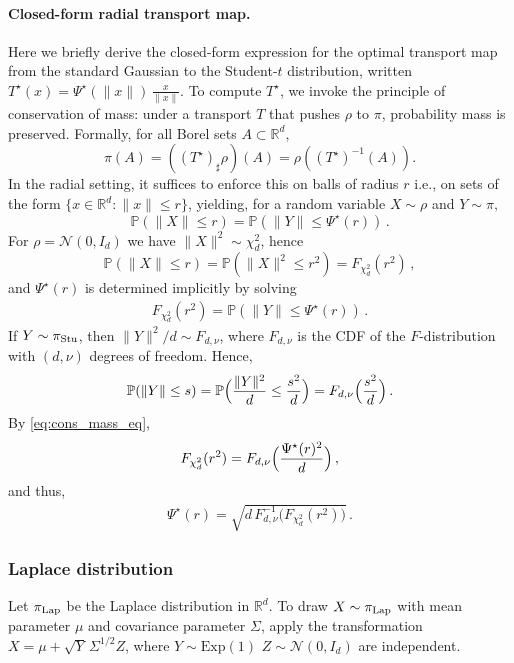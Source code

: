 \documentclass[twoside]{article}
\newcommand{\1}{\mathds{1}}
\newcommand{\R}{\mathbb{R}}
\theoremstyle{plain}
\theoremstyle{definition}
\theoremstyle{remark}
\begin{document}
\paragraph{Closed-form radial transport map.}
Here we briefly derive the closed-form expression for the optimal transport map from the standard Gaussian to the Student-$t$ distribution, written $T^\star(x) = \Psi^\star(\|x\|)\,\frac{x}{\|x\|}$. 
To compute $T^\star$, we invoke the principle of conservation of mass: under a transport $T$ that pushes $\rho$ to $\pi$, probability mass is preserved. Formally, for all Borel sets $A\subset\mathbb{R}^d$,
\[
\pi(A) = ((T^\star)_\sharp \rho)(A) = \rho\!\left((T^\star)^{-1}(A)\right).
\]
In the radial setting, it suffices to enforce this on balls of radius $r$ i.e., on sets of the form $\{x\in\R^d :\|x\|\le r\}$, yielding, for a random variable $X\sim\rho$ and $Y\sim\pi,$
\[
\mathbb{P}(\|X\|\le r)=\mathbb{P}(\|Y\|\le \Psi^\star(r))\,.
\]
For $\rho=\mathcal{N}(0,I_d)$ we have $\|X\|^2\sim\chi_d^2$, hence
\[
\mathbb{P}(\|X\|\le r)=\mathbb{P}(\|X\|^2\le r^2)=F_{\chi^2_d}(r^2)\, ,
\]
and ${\Psi^\star(r)}$ is determined implicitly by solving
\begin{align}\label{eq:cons_mass_eq}
    F_{\chi^2_d}(r^2)=\mathbb{P}(\|Y\|\le \Psi^\star(r))\,.
\end{align}
If $Y\sim\pi_{\rm Stu}$, then $\|Y\|^2/d\sim F_{d,\nu}$, where $F_{d,\nu}$ is the CDF of the $F$-distribution with $(d,\nu)$ degrees of freedom. Hence,
\begin{align*}
\mathbb{P}(\|Y\|\le s)=\mathbb{P}\Bigl(\frac{\|Y\|^2}{d}\le \frac{s^2}{d}\Bigr)=F_{d,\nu}\Bigl(\frac{s^2}{d}\Bigr)\,.
\end{align*}
By \eqref{eq:cons_mass_eq},
\begin{align*}
F_{\chi^2_d}(r^2) = F_{d,\nu}\Bigl(\frac{\Psi^\star(r)^2}{d}\Bigr)\,,
\end{align*}
and thus,
\begin{align*}
    \Psi^\star(r) = \sqrt{d\,F^{-1}_{d,\nu}\bigl(F_{\chi^2_d}(r^2)\bigr)}\,.
\end{align*}


\subsubsection{Laplace distribution}
Let $\pi_{\rm Lap}$ be the Laplace distribution in $\R^d$. {To draw $X \sim \pi_{\rm Lap}$ with mean parameter $\mu$ and covariance parameter $\Sigma$, apply the transformation $X = \mu + \sqrt{Y}\,\Sigma^{1/2} Z$, where $Y \sim \mathrm{Exp}(1)$ 
$Z \sim \mathcal{N}(0,I_d)$ are independent. }
\end{document}

